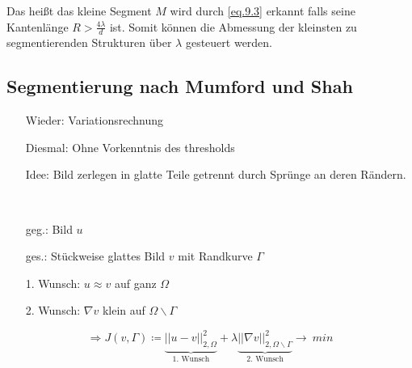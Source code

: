 \documentclass{article}
\theoremstyle{plain}
\theoremstyle{definition}
\numberwithin{equation}{section}
\newcommand{\norm}[1] {
\left|\left| #1 \right|\right|
}
\newcommand{\quo}[1] {
\glqq #1 \grqq
}
\begin{document}
Das heißt das kleine Segment $M$ wird durch \ref{eq.9.3} \quo{erkannt} falls seine Kantenlänge $R>\frac{4 \lambda}{d}$ ist. Somit können die Abmessung der kleinsten zu segmentierenden Strukturen über $\lambda$ gesteuert werden.

\subsection{Segmentierung nach Mumford und Shah}

\begin{minipage}{.65\textwidth}
    \begin{enumerate}
        \item[Wieder:] Variationsrechnung
        \item[Diesmal:] Ohne Vorkenntnis des thresholds
        \item[Idee:] Bild zerlegen in \quo{glatte} Teile getrennt durch Sprünge an deren Rändern.
        \item[] \
        \item[geg.:] Bild $u$
        \item[ges.:] Stückweise glattes Bild $v$ mit Randkurve $\Gamma$
    \end{enumerate}
    \begin{enumerate}
        \item[1. Wunsch:] $u \approx v$ auf ganz $\Omega$
        \item[2. Wunsch:] $\nabla v$ klein auf $\Omega \backslash \Gamma$
    \end{enumerate}
\end{minipage}%
\begin{minipage}{0.3\textwidth}
\begin{center}
\end{center}
\end{minipage}

\[\Rightarrow J(v,\Gamma)  \coloneqq  \underbrace{\norm{u-v}_{2,\Omega}^2}_{1. \text{ Wunsch}}  + \lambda \underbrace{\norm{\nabla v}_{2,\Omega \backslash \Gamma}^2}_{2. \text{ Wunsch}} \to \ min \]
\end{document}
